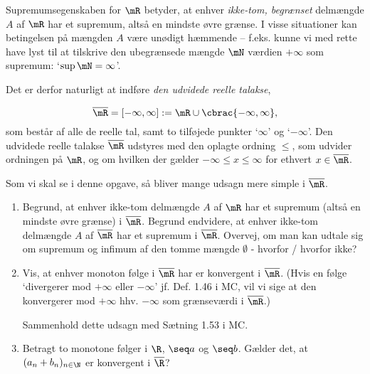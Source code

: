 \setcounter{section}{2}


\begin{opg} \hfill

\noindent
Supremumsegenskaben for $\mR$ betyder, at enhver \textit{ikke-tom, begrænset} delmængde $A$ af $\mR$ har et supremum, altså en mindste øvre grænse. I visse situationer kan betingelsen på mængden $A$ være unødigt hæmmende -- f.eks. kunne vi med rette have lyst til at tilskrive den ubegrænsede mængde $\mN$ værdien  $+\infty$ som supremum: `$\sup \mN = \infty$'. 

Det er derfor naturligt at indføre \textit{den udvidede reelle talakse}, 

$$ \overline{\mR} = [- \infty, \infty] := \mR \cup \cbrac{- \infty, \infty}, $$
som består af alle de reelle tal, samt to tilføjede punkter `$\infty$' og `$- \infty$'. Den udvidede reelle talakse $\overline{\mR}$ udstyres med den oplagte ordning $\leq$, som udvider ordningen på $\mR$, og om hvilken der gælder $- \infty \leq x \leq  \infty$ for ethvert $x \in \overline{\mR}$. 
 
Som vi skal se i denne opgave, så bliver mange udsagn mere simple i $\overline{\mR}$.


\begin{enumerate}
	\item Begrund, at enhver ikke-tom delmængde $A$ af $\mR$ har et supremum (altså en mindste øvre grænse) i $\overline{\mR}$. Begrund endvidere, at enhver ikke-tom delmængde $A$ af $\overline{\mR}$ har et supremum i $\overline{\mR}$. Overvej, om man kan udtale sig om supremum og infimum af den tomme mængde $\emptyset$ - hvorfor / hvorfor ikke?
	
	\item Vis, at enhver monoton følge i $\overline{\mR}$ har er konvergent i $\overline{\mR}$. (Hvis en følge `divergerer mod $+ \infty$ eller $- \infty$' jf. Def. 1.46 i MC, vil vi sige at den konvergerer mod $+ \infty$ hhv. $- \infty$ som grænseværdi i $\overline{\mR}$.)
	
	Sammenhold dette udsagn med Sætning 1.53 i MC. 
	
	\item Betragt to monotone følger i $ \R $, $ \seq a $ og $ \seq b $. Gælder det, at $ (a_n+b_n)_{n\in \N} $ er konvergent i $ \overline{\R} $?
\end{enumerate}
\end{opg}

